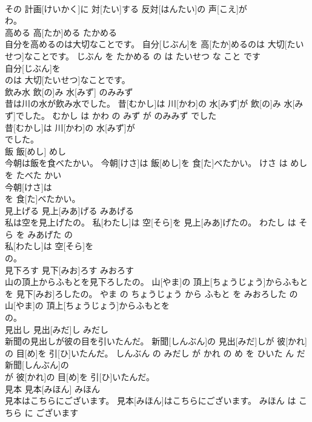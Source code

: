 \documentclass[8pt]{extreport}
\begin{document}
\begin{CJK}{UTF8}{min}
\\	その 計画[けいかく]に 対[たい]する 反対[はんたい]の 声[こえ]が
\\	わ。			
\\	高める	高[たか]める	たかめる	
\\	自分を高めるのは大切なことです。	自分[じぶん]を 高[たか]めるのは 大切[たいせつ]なことです。	じぶん を たかめる の は たいせつ な こと です	
\\	自分[じぶん]を
\\	のは 大切[たいせつ]なことです。			
\\	飲み水	飲[の]み 水[みず]	のみみず	
\\	昔は川の水が飲み水でした。	昔[むかし]は 川[かわ]の 水[みず]が 飲[の]み 水[みず]でした。	むかし は かわ の みず が のみみず でした	
\\	昔[むかし]は 川[かわ]の 水[みず]が
\\	でした。			
\\	飯	飯[めし]	めし	
\\	今朝は飯を食べたかい。	今朝[けさ]は 飯[めし]を 食[た]べたかい。	けさ は めし を たべた かい	
\\	今朝[けさ]は
\\	を 食[た]べたかい。			
\\	見上げる	見上[みあ]げる	みあげる	
\\	私は空を見上げたの。	私[わたし]は 空[そら]を 見上[みあ]げたの。	わたし は そら を みあげた の	
\\	私[わたし]は 空[そら]を
\\	の。			
\\	見下ろす	見下[みお]ろす	みおろす	
\\	山の頂上からふもとを見下ろしたの。	山[やま]の 頂上[ちょうじょう]からふもとを 見下[みお]ろしたの。	やま の ちょうじょう から ふもと を みおろした の	
\\	山[やま]の 頂上[ちょうじょう]からふもとを
\\	の。			
\\	見出し	見出[みだ]し	みだし	
\\	新聞の見出しが彼の目を引いたんだ。	新聞[しんぶん]の 見出[みだ]しが 彼[かれ]の 目[め]を 引[ひ]いたんだ。	しんぶん の みだし が かれ の め を ひいた ん だ	
\\	新聞[しんぶん]の
\\	が 彼[かれ]の 目[め]を 引[ひ]いたんだ。			
\\	見本	見本[みほん]	みほん	
\\	見本はこちらにございます。	見本[みほん]はこちらにございます。	みほん は こちら に ございます	

\end{CJK}
\end{document}
